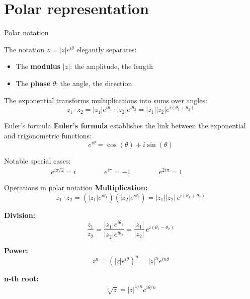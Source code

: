 \documentclass[aspectratio=169,12pt]{beamer}
\begin{document}
\section{Polar representation}

\begin{frame}{Polar notation}

  \bigskip
  The notation $z = |z| e^{i\theta}$ elegantly separates:

  \bigskip
  \begin{itemize}
    \setlength{\itemsep}{1em}
    \item The \textbf{modulus} $|z|$: the amplitude, the length
    \item The \textbf{phase} $\theta$: the angle, the direction
  \end{itemize}

  \begin{flushright}
    \vspace{-35mm}
  \end{flushright}

  The exponential transforms multiplications into sums over angles:
  \[
    z_1 \cdot z_2 = |z_1| e^{i\theta_1} \cdot |z_2| e^{i\theta_2} = |z_1||z_2| e^{i(\theta_1 + \theta_2)}
  \]

\end{frame}

\begin{frame}{Euler's formula}
  \textbf{Euler's formula} establishes the link between the exponential and trigonometric functions:
  \[
    e^{i\theta} = \cos(\theta) + i\sin(\theta)
  \]
  
  \bigskip
  Notable special cases:
  \begin{align*}
    e^{i\pi/2} = i \qquad\qquad
    e^{i\pi} = -1 \qquad\qquad
    e^{2i\pi} = 1 \qquad\qquad
  \end{align*}
\end{frame}

\begin{frame}{Operations in polar notation}
  \textbf{Multiplication:}
  \[
    z_1 \cdot z_2 = (|z_1| e^{i\theta_1})(|z_2| e^{i\theta_2}) = |z_1||z_2| \, e^{i(\theta_1+\theta_2)}
  \]
  
  \textbf{Division:}
  \[
    \frac{z_1}{z_2} = \frac{|z_1| e^{i\theta_1}}{|z_2| e^{i\theta_2}} = \frac{|z_1|}{|z_2|} \, e^{i(\theta_1-\theta_2)}
  \]
  
  \textbf{Power:}
  \[
    z^n = (|z| e^{i\theta})^n = |z|^n e^{in\theta}
  \]
  
  \textbf{n-th root:}
  \[
    \sqrt[n]{z} = |z|^{1/n} e^{i\theta/n}
  \]
\end{frame}
\end{document}
